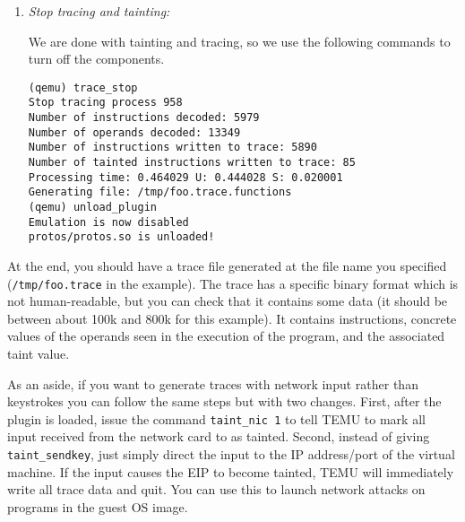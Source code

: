 \begin {enumerate}
\begin{Verbatim}[frame=lines, framesep=.5em]
(qemu) taint_sendkey 5 1001
Tainting keystroke: 9 00000001
(qemu) taint_sendkey ret 1001
Tainting keystroke: 9 00000001
Time of first tainted data: 1197072993.761231
(qemu) 
\end{Verbatim}

Note that TEMU is tracking taint throughout the whole simulated
machine, but only tracing in the requested process. The \texttt{first
tainted data} message refers to the traced program, and doesn't show
up until a complete line has been typed, because the operating system
is buffering the input line before that.

\item \emph {Stop tracing and tainting:}

We  are  done with  tainting  and tracing,  so  we  use the  following
commands to turn off the components.

\begin{Verbatim}[frame=lines, framesep=.5em]
(qemu) trace_stop
Stop tracing process 958
Number of instructions decoded: 5979
Number of operands decoded: 13349
Number of instructions written to trace: 5890
Number of tainted instructions written to trace: 85
Processing time: 0.464029 U: 0.444028 S: 0.020001
Generating file: /tmp/foo.trace.functions
(qemu) unload_plugin
Emulation is now disabled
protos/protos.so is unloaded!
\end{Verbatim}

\end {enumerate}

At the end, you should have a trace file generated at the file name
you specified (\verb'/tmp/foo.trace' in the example). The trace has a
specific binary format which is not human-readable, but you can check
that it contains some data (it should be between about 100k and 800k
for this example).  It
contains instructions, concrete values of the operands seen in the
execution of the program, and the associated taint value.

As an aside, if you want to generate traces with network input rather
than keystrokes you can follow the same steps but with two
changes. First, after the plugin is loaded, issue the command
\verb'taint_nic 1' to tell TEMU to mark all input
received from the network card to as tainted. Second, instead of
giving \texttt{taint\_sendkey}, just simply direct the input to the IP
address/port of the virtual machine. If the input causes the EIP to
become tainted, TEMU will immediately write all trace data and
quit. You can use this to launch network attacks on programs in the
guest OS image.








